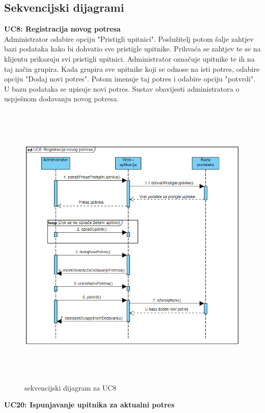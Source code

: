 			\subsection{Sekvencijski dijagrami}
				
			\textbf{UC8: Registracija novog potresa}\\
			{Administrator odabire opciju "Pristigli upitnici". Poslužitelj potom šalje zahtjev bazi podataka kako bi dohvatio sve pristigle upitnike. Prihvaća se zahtjev te se na klijentu prikazuju svi pristigli upitnici. Administrator označuje upitnike te ih na taj način grupira. Kada grupira sve upitnike koji se odnose na isti potres, odabire opciju "Dodaj novi potres". Potom imenuje taj potres i odabire opciju "potvrdi". U bazu podataka se upisuje novi potres. Sustav obavijesti administratora o uspješnom dodavanju novog potresa.}
			\begin{figure}[H]
				  \includegraphics[width=\textwidth, height=14cm]{slike/uc8.PNG}
				  \caption{sekvencijski dijagram za UC8}
				  \label{fig:sekvuc4} 
				 \end{figure}
			\textbf{UC20: Ispunjavanje upitnika za aktualni potres}\\
